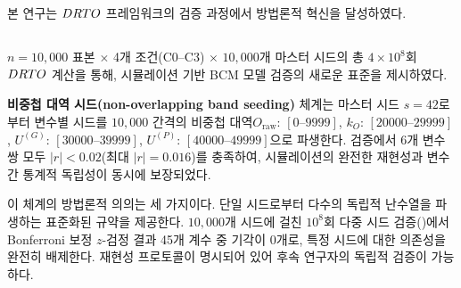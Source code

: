 

\section{}
\label{sec:methodological-implications}

본 연구는 $DRTO$ 프레임워크의 검증 과정에서  방법론적 혁신을
달성하였다. 


\subsection{}
\label{subsec:mc-methodology}

 $n = 10{,}000$ 표본 $\times$ 4개 조건(C0--C3) $\times$ $10{,}000$개 마스터 시드의
총 $4 \times 10^8$회 $DRTO$ 계산을 통해, 시뮬레이션 기반 BCM 모델 검증의
새로운 표준을 제시하였다.

\textbf{비중첩 대역 시드(non-overlapping band seeding)} 체계는 마스터 시드
$s = 42$로부터 변수별 시드를 $10{,}000$ 간격의 비중첩 대역\chg{(}$O_{\mathrm{raw}}$:
$[0\text{--}9999]$, $k_O$: $[20000\text{--}29999]$, $U^{(G)}$:
$[30000\text{--}39999]$, $U^{(P)}$: $[40000\text{--}49999]$\chg{)}으로
파생한다.  검증에서 6개 변수쌍 모두 $|r| < 0.02$(최대 $|r| = 0.016$)를
충족하여, 시뮬레이션의 완전한 재현성과 변수 간 통계적 독립성이 동시에 보장되었다.

이 체계의 방법론적 의의는 세 가지이다.
 단일 시드로부터 다수의 독립적 난수열을 파생하는 표준화된 규약을 제공한다.
 $10{,}000$개 시드에 걸친 $10^8$회 다중 시드 검증()에서 Bonferroni 보정
$z$-검정 결과 45개 계수 중 기각이 $0$개로, 특정 시드에 대한 의존성을 완전히
배제한다.  재현성 프로토콜이 명시되어 있어 후속 연구자의 독립적 검증이 가능하다.


\subsection{}
\label{subsec:kappa-optimization}

